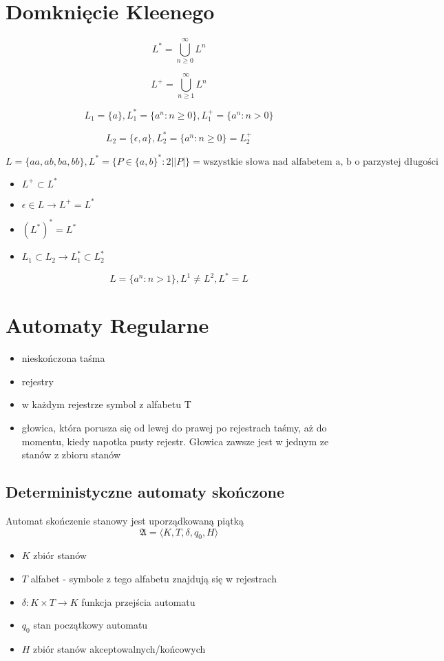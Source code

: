 \documentclass{../notatki}
\begin{document}
\section{Domknięcie Kleenego}

$$
L^* = \bigcup_{n \ge 0}^{\infty}L^n
$$

$$
L^+ = \bigcup_{n \ge 1}^{\infty}L^n
$$

$$
L_1 = \{a\}, L_1^* = \{a^n : n \ge 0\}, L_1^+ = \{a^n : n > 0\}
$$

$$
L_2 = \{\epsilon, a\}, L_2^* = \{a^n : n \ge 0\} = L_2^+
$$

$$
L = \{aa, ab, ba, bb\}, L^* = \{P \in \{a, b\}^* : 2 | |P|\} =
\text{wszystkie słowa nad alfabetem {a, b} o parzystej długości}
$$

\begin{itemize}
  \item $L^+ \subset L^*$
  \item $\epsilon \in L \rightarrow L^+ = L^*$
  \item $(L^*)^* = L^*$
  \item $L_1 \subset L_2 \rightarrow L_1^* \subset L_2^*$
\end{itemize}

$$
L = \{a^n : n > 1\}, L^1 \ne L^2, L^* = L
$$

\section{Automaty Regularne}

\begin{itemize}
  \item nieskończona taśma
  \item rejestry
  \item w każdym rejestrze symbol z alfabetu T
  \item głowica, która porusza się od lewej do prawej po rejestrach
    taśmy, aż do momentu, kiedy napotka pusty rejestr. Głowica zawsze
    jest w jednym ze stanów z zbioru stanów
\end{itemize}

\subsection{Deterministyczne automaty skończone}

Automat skończenie stanowy jest uporządkowaną piątką
$$
\mathfrak{A} = \langle K,T,\delta,q_0,H \rangle
$$

\begin{itemize}
  \item $K$   zbiór stanów
  \item $T$   alfabet - symbole z tego alfabetu znajdują się w rejestrach
  \item $\delta: K \times T \rightarrow K$  funkcja przejścia automatu
  \item $q_0$ stan początkowy automatu
  \item $H$ zbiór stanów akceptowalnych/końcowych
\end{itemize}
\end{document}
